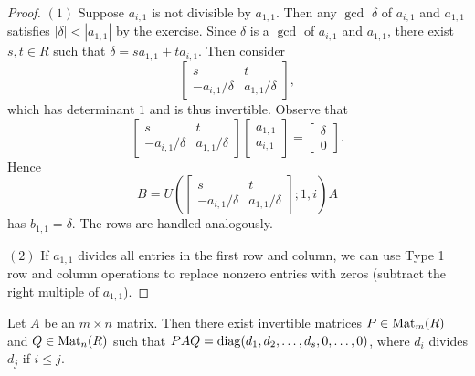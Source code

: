 \begin{proof}
  $(1)$ Suppose $a_{i, 1}$ is not divisible by
  $a_{1, 1}$. Then any $\gcd$ $\delta$ of
  $a_{i, 1}$ and $a_{1, 1}$ satisfies $|\delta| < |a_{1, 1}|$
  by the exercise. Since $\delta$ is a $\gcd$ of
  $a_{i, 1}$ and $a_{1, 1}$, there exist $s, t \in R$
  such that $\delta = s a_{1, 1} + t a_{i, 1}$. Then
  consider
  \[
    \begin{bmatrix}
      s & t \\
      -a_{i, 1} / \delta & a_{1, 1} / \delta
    \end{bmatrix},
  \]
  which has determinant $1$ and is thus invertible. Observe
  that
  \[
    \begin{bmatrix}
      s & t \\
      -a_{i, 1} / \delta & a_{1, 1} / \delta
    \end{bmatrix}
    \begin{bmatrix}
      a_{1, 1} \\ a_{i, 1}
    \end{bmatrix}
    =
    \begin{bmatrix}
      \delta \\ 0
    \end{bmatrix}.
  \]
  Hence
  \[
    B = U\left(\begin{bmatrix} s & t \\ -a_{i, 1} / \delta & a_{1, 1} / \delta \end{bmatrix}; 1, i\right) A
  \]
  has $b_{1, 1} = \delta$. The rows are handled
  analogously.

  $(2)$ If $a_{1, 1}$ divides all entries in the
  first row and column, we can use Type 1 row and
  column operations to replace nonzero entries with zeros
  (subtract the right multiple of $a_{1, 1}$).
\end{proof}

\begin{prop}
  Let $A$ be an $m \times n$ matrix. Then there exist
  invertible matrices $P \in \operatorname{Mat}_m(R)$ and
  $Q \in \operatorname{Mat}_n(R)$ such that $PAQ = \operatorname{diag}(d_1, d_2, \dots, d_s, 0, \dots, 0)$,
  where $d_i$ divides $d_j$ if $i \le j$.
\end{prop}

